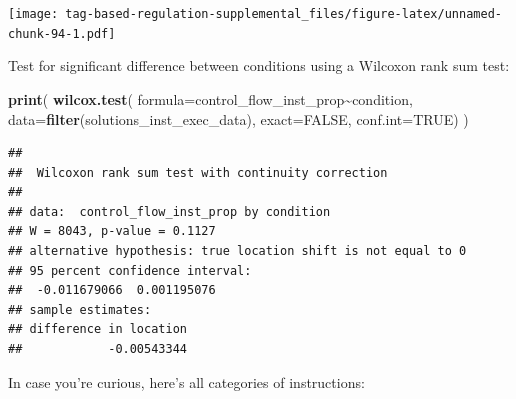 \documentclass[
]{book}
\newenvironment{Shaded}{\begin{snugshade}}{\end{snugshade}}
\newcommand{\DataTypeTok}[1]{\textcolor[rgb]{0.13,0.29,0.53}{#1}}
\newcommand{\KeywordTok}[1]{\textcolor[rgb]{0.13,0.29,0.53}{\textbf{#1}}}
\newcommand{\NormalTok}[1]{#1}
\newcommand{\OperatorTok}[1]{\textcolor[rgb]{0.81,0.36,0.00}{\textbf{#1}}}
\newcommand{\OtherTok}[1]{\textcolor[rgb]{0.56,0.35,0.01}{#1}}
\begin{document}
\texttt{[image: tag-based-regulation-supplemental\_files/figure-latex/unnamed-chunk-94-1.pdf]}

Test for significant difference between conditions using a Wilcoxon rank sum test:

\begin{Shaded}
\begin{Highlighting}[]
\KeywordTok{print}\NormalTok{(}
  \KeywordTok{wilcox.test}\NormalTok{(}
    \DataTypeTok{formula=}\NormalTok{control\_flow\_inst\_prop}\OperatorTok{\textasciitilde{}}\NormalTok{condition,}
    \DataTypeTok{data=}\KeywordTok{filter}\NormalTok{(solutions\_inst\_exec\_data),}
    \DataTypeTok{exact=}\OtherTok{FALSE}\NormalTok{,}
    \DataTypeTok{conf.int=}\OtherTok{TRUE}\NormalTok{)}
\NormalTok{)}
\end{Highlighting}
\end{Shaded}

\begin{verbatim}
## 
##  Wilcoxon rank sum test with continuity correction
## 
## data:  control_flow_inst_prop by condition
## W = 8043, p-value = 0.1127
## alternative hypothesis: true location shift is not equal to 0
## 95 percent confidence interval:
##  -0.011679066  0.001195076
## sample estimates:
## difference in location 
##            -0.00543344
\end{verbatim}

In case you're curious, here's all categories of instructions:
\end{document}
